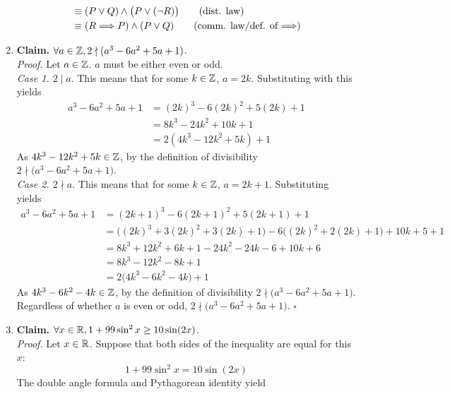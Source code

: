 \documentclass[../MATH135.tex]{subfiles}
\begin{document}
\begin{enumerate}
\begin{align*}
						&\equiv (P \lor Q) \land \bigl(P \lor (\lnot R)\bigr) \tag{dist. law} \\
						&\equiv (R \simp P) \land (P \lor Q) \tag{comm. law/def. of \(\simp\)}
				\end{align*}
			\item
				\textbf{Claim.} \(\forall a \in \mathbb{Z}, 2 \nmid (a^3 - 6a^2 + 5a + 1)\). \\
					\textit{Proof.} 
						Let \(a \in \mathbb{Z}\). \(a\) must be either even or odd. \\
						\textit{Case 1. \(2 \mid a\)}.
							This means that for some \(k \in \mathbb{Z}\), \(a = 2k\). Substituting with this yields
								\begin{align*}
									a^3 - 6a^2 + 5a + 1 &= (2k)^3 - 6(2k)^2 + 5(2k) + 1 \\
										&= 8k^3 - 24k^2 + 10k + 1 \\
										&= 2(4k^3 - 12k^2 + 5k) + 1	
								\end{align*}
							As \(4k^3 - 12k^2 + 5k \in \mathbb{Z}\), by the definition of divisibility \(2 \nmid \bigl(a^3 - 6a^2 + 5a + 1\bigr)\). \\
						\textit{Case 2. \(2 \nmid a\)}.
							This means that for some \(k \in \mathbb{Z}\), \(a = 2k + 1\). Substituting yields
								\begin{align*}
									a^3 - 6a^2 + 5a + 1 &= 	(2k + 1)^3 - 6(2k + 1)^2 + 5(2k + 1) + 1 \\
										&= \bigl((2k)^3 + 3(2k)^2 + 3(2k) + 1\bigr) - 6\bigl((2k)^2 + 2(2k) + 1\bigr) + 10k + 5 + 1 \\
										&= 8k^3 + 12k^2 + 6k + 1 - 24k^2 - 24k - 6 + 10k + 6 \\
										&= 8k^3 - 12k^2 - 8k + 1 \\
										&= 2\bigl(4k^3 - 6k^2 - 4k\bigr) + 1
								\end{align*}
							As \(4k^3 - 6k^2 - 4k \in \mathbb{Z}\), by the definition of divisibility \(2 \nmid \bigl(a^3 - 6a^2 + 5a + 1\bigr)\). \\
						Regardless of whether \(a\) is even or odd, \(2 \nmid \bigl(a^3 - 6a^2 + 5a + 1\bigr)\). \(\square\)
			\item
				\textbf{Claim.} \(\forall x \in \mathbb{R}, 1 + 99\sin^2x \ge 10\sin(2x)\). \\
					\textit{Proof.} 
						Let \(x \in \mathbb{R}\). Suppose that both sides of the inequality are equal for this \(x\):
							\[1 + 99\sin^2x = 10\sin(2x)\]
							The double angle formula and Pythagorean identity yield
							\begin{align*}

\end{align*}
\end{enumerate}
\end{document}
